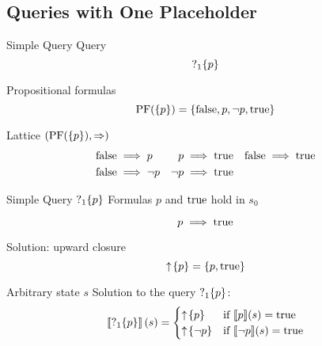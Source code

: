 \subsection[One Placeholder]{Queries with One Placeholder}

\begin{frame}{Simple Query}
  Query  
  \[ \operatorname{?}_1\{p\} \]

  \vfill

  Propositional formulas
  \[ \operatorname{PF}(\{p\}) = \{\operatorname{false}, p, \lnot p, \operatorname{true}\} \]
\end{frame}

\begin{frame}{Lattice $(\operatorname{PF}(\{p\}),\Rightarrow)$}
  \begin{align*}
    \operatorname{false} &\implies p & p &\implies \operatorname{true} & \operatorname{false} &\implies \operatorname{true} \\
    \operatorname{false} &\implies \lnot p & \lnot p &\implies \operatorname{true} & & 
  \end{align*}

  \pause
  
  \begin{center}
  \end{center}
\end{frame}

\begin{frame}{Simple Query $\operatorname{?}_1\{p\}$}
  Formulas $p$ and $\operatorname{true}$ hold in $s_0$
  
  \[ p \implies \operatorname{true} \]
  
  Solution: upward closure 
  \[ \uparrow \! \left\{ p \right\} = \{ p, \operatorname{true}\} \]
\end{frame}

\begin{frame}{Arbitrary state $s$}
  Solution to the query $\operatorname{?}_1\{p\}$:
  \[ \left\llbracket \operatorname{?}_1\{p\} \right\rrbracket (s) = \begin{cases}
       \uparrow \! \left\{ p \right\} & \text{if } \llbracket p \rrbracket (s) = \operatorname{true} \\
       \uparrow \! \left\{ \lnot p \right\} & \text{if } \llbracket \lnot p \rrbracket (s) = \operatorname{true}
     \end{cases} 
  \]
\end{frame}


